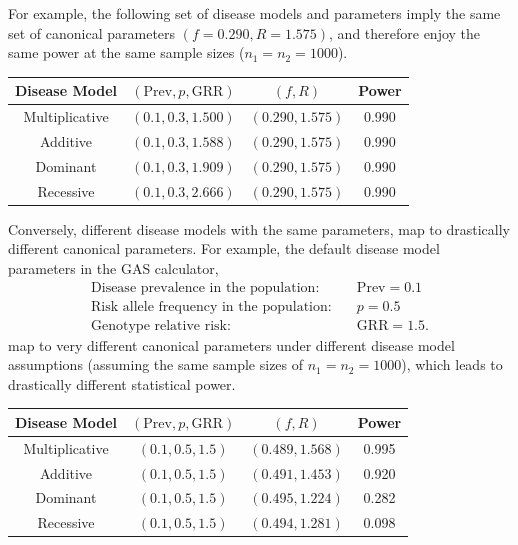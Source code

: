 For example, the following set of disease models and parameters imply the same set of canonical parameters $(f = 0.290, R = 1.575)$, and therefore enjoy the same power at the same sample sizes ($n_1 = n_2 = 1000$).
\begin{center}
    \begin{tabular}{cc|cc}
    \hline
    Disease Model & $(\text{Prev}, p, \text{GRR})$ & $(f, R)$ & Power \\
    \hline 
    Multiplicative & $(0.1, 0.3, 1.500)$ & $(0.290, 1.575)$ & 0.990 \\
    Additive & $(0.1, 0.3, 1.588)$ & $(0.290, 1.575)$ & 0.990 \\
    Dominant & $(0.1, 0.3, 1.909)$ & $(0.290, 1.575)$ & 0.990 \\
    Recessive & $(0.1, 0.3, 2.666)$ & $(0.290, 1.575)$ & 0.990 \\
    \hline
    \end{tabular}
\end{center}

Conversely, different disease models with the same parameters, map to drastically different canonical parameters.
For example, the default disease model parameters in the GAS calculator,
\begin{align}
    \text{Disease prevalence in the population}: & \quad \text{Prev} = 0.1 \\
    \text{Risk allele frequency in the population}: & \quad p = 0.5\\
    \text{Genotype relative risk}: & \quad \text{GRR} = 1.5.
\end{align}
map to very different canonical parameters under different disease model assumptions (assuming the same sample sizes of $n_1 = n_2 = 1000$), which leads to drastically different statistical power.
\begin{center}
    \begin{tabular}{cc|cc}
    \hline
    Disease Model & $(\text{Prev}, p, \text{GRR})$ & $(f, R)$ & Power \\
    \hline 
    Multiplicative & $(0.1, 0.5, 1.5)$ & $(0.489, 1.568)$ & 0.995 \\
    Additive & $(0.1, 0.5, 1.5)$ & $(0.491, 1.453)$ & 0.920 \\
    Dominant & $(0.1, 0.5, 1.5)$ & $(0.495, 1.224)$ & 0.282 \\
    Recessive & $(0.1, 0.5, 1.5)$ & $(0.494, 1.281)$ & 0.098 \\
    \hline
    \end{tabular}
\end{center}

